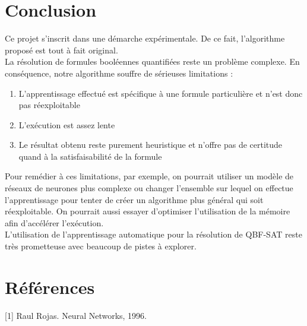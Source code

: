 \documentclass{article}
\begin{document}
\section{Conclusion}
Ce projet s'inscrit dans une démarche expérimentale. De ce fait, l'algorithme proposé est tout à fait original.\\
La résolution de formules booléennes quantifiées reste un problème complexe. En conséquence, notre algorithme souffre de sérieuses limitations :
\begin{enumerate}
\item L'apprentissage effectué est spécifique à une formule particulière et n'est donc pas réexploitable
\item L'exécution est assez lente
\item Le résultat obtenu reste purement heuristique et n'offre pas de certitude quand à la satisfaisabilité de la formule
\end{enumerate}
Pour remédier à ces limitations, par exemple, on pourrait utiliser un modèle de réseaux de neurones plus complexe ou changer l'ensemble sur lequel on effectue l'apprentissage pour tenter de créer un algorithme plus général qui soit réexploitable. On pourrait aussi essayer d'optimiser l'utilisation de la mémoire afin d'accélérer l'exécution.\\
L'utilisation de l'apprentissage automatique pour la résolution de QBF-SAT reste très prometteuse avec beaucoup de pistes à explorer.

\section{Références}
[1] Raul Rojas. Neural Networks, 1996. 
\newpage
\end{document}
